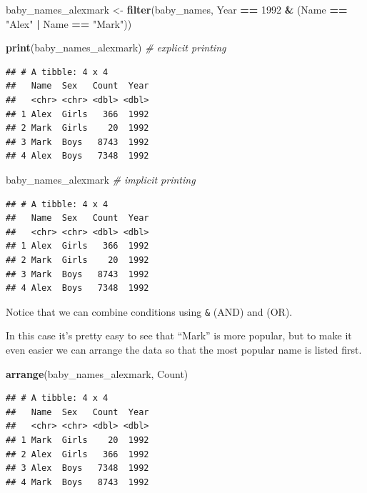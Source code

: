 \documentclass[]{book}
\newenvironment{Shaded}{\begin{snugshade}}{\end{snugshade}}
\newcommand{\KeywordTok}[1]{\textcolor[rgb]{0.13,0.29,0.53}{\textbf{#1}}}
\newcommand{\DecValTok}[1]{\textcolor[rgb]{0.00,0.00,0.81}{#1}}
\newcommand{\StringTok}[1]{\textcolor[rgb]{0.31,0.60,0.02}{#1}}
\newcommand{\CommentTok}[1]{\textcolor[rgb]{0.56,0.35,0.01}{\textit{#1}}}
\newcommand{\OperatorTok}[1]{\textcolor[rgb]{0.81,0.36,0.00}{\textbf{#1}}}
\newcommand{\NormalTok}[1]{#1}
\begin{document}
\begin{Shaded}
\begin{Highlighting}[]
\NormalTok{baby_names_alexmark <-}\StringTok{ }\KeywordTok{filter}\NormalTok{(baby_names, }
\NormalTok{             Year }\OperatorTok{==}\StringTok{ }\DecValTok{1992} \OperatorTok{&}\StringTok{ }\NormalTok{(Name }\OperatorTok{==}\StringTok{ "Alex"} \OperatorTok{|}\StringTok{ }\NormalTok{Name }\OperatorTok{==}\StringTok{ "Mark"}\NormalTok{))}

\KeywordTok{print}\NormalTok{(baby_names_alexmark) }\CommentTok{# explicit printing}
\end{Highlighting}
\end{Shaded}

\begin{verbatim}
## # A tibble: 4 x 4
##   Name  Sex   Count  Year
##   <chr> <chr> <dbl> <dbl>
## 1 Alex  Girls   366  1992
## 2 Mark  Girls    20  1992
## 3 Mark  Boys   8743  1992
## 4 Alex  Boys   7348  1992
\end{verbatim}

\begin{Shaded}
\begin{Highlighting}[]
\NormalTok{baby_names_alexmark }\CommentTok{# implicit printing}
\end{Highlighting}
\end{Shaded}

\begin{verbatim}
## # A tibble: 4 x 4
##   Name  Sex   Count  Year
##   <chr> <chr> <dbl> <dbl>
## 1 Alex  Girls   366  1992
## 2 Mark  Girls    20  1992
## 3 Mark  Boys   8743  1992
## 4 Alex  Boys   7348  1992
\end{verbatim}

Notice that we can combine conditions using \texttt{\&} (AND) and
\texttt{\textbar{}} (OR).

In this case it's pretty easy to see that ``Mark'' is more popular, but
to make it even easier we can arrange the data so that the most popular
name is listed first.

\begin{Shaded}
\begin{Highlighting}[]
\KeywordTok{arrange}\NormalTok{(baby_names_alexmark, Count)}
\end{Highlighting}
\end{Shaded}

\begin{verbatim}
## # A tibble: 4 x 4
##   Name  Sex   Count  Year
##   <chr> <chr> <dbl> <dbl>
## 1 Mark  Girls    20  1992
## 2 Alex  Girls   366  1992
## 3 Alex  Boys   7348  1992
## 4 Mark  Boys   8743  1992
\end{verbatim}
\end{document}
